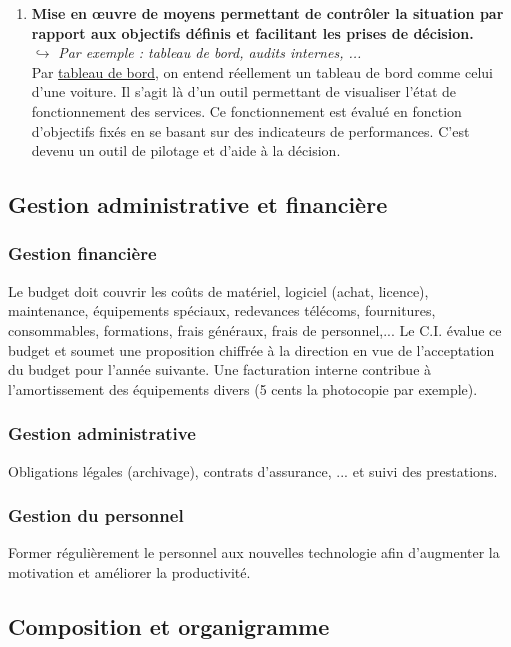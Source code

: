 \documentclass[10pt,a4paper,oneside,titlepage]{report}
\newcommand{\titre}[1]{\textcolor{title}{#1}}
\newcommand{\newterm}[1]{\textit{#1}}
\newcommand{\strong}[1]{\textbf{\titre{#1}}}
\begin{document}
\begin{sffamily}
\begin{enumerate}
\item \strong{Mise en \oe uvre de moyens permettant de contrôler la situation par rapport aux objectifs définis et facilitant les prises de décision.} \\
$\hookrightarrow$ \newterm{Par exemple : tableau de bord, audits internes, ... } \\
Par \underline{tableau de bord}, on entend réellement un tableau de bord comme celui d'une voiture. Il s'agit là d'un outil permettant de visualiser l'état de 
fonctionnement des services. Ce fonctionnement est évalué en fonction d'objectifs fixés en se basant sur des indicateurs de performances. C'est devenu un outil de pilotage 
et d'aide à la décision.
\end{enumerate}

\subsection{Gestion administrative et financière}

\subsubsection{Gestion financière}

Le budget doit couvrir les coûts de matériel, logiciel (achat, licence), maintenance, équipements spéciaux, redevances télécoms, fournitures, consommables, formations, 
frais généraux, frais de personnel,... Le C.I. évalue ce budget et soumet une proposition chiffrée à la direction en vue de l'acceptation du budget pour l'année suivante.
Une facturation interne contribue à l'amortissement des équipements divers (5 cents la photocopie par exemple).

\subsubsection{Gestion administrative}

Obligations légales (archivage), contrats d'assurance, ... et suivi des prestations.

\subsubsection{Gestion du personnel}

Former régulièrement le personnel aux nouvelles technologie afin d'augmenter la motivation et améliorer la productivité.

\subsection{Composition et organigramme}


\end{sffamily}
\end{document}

